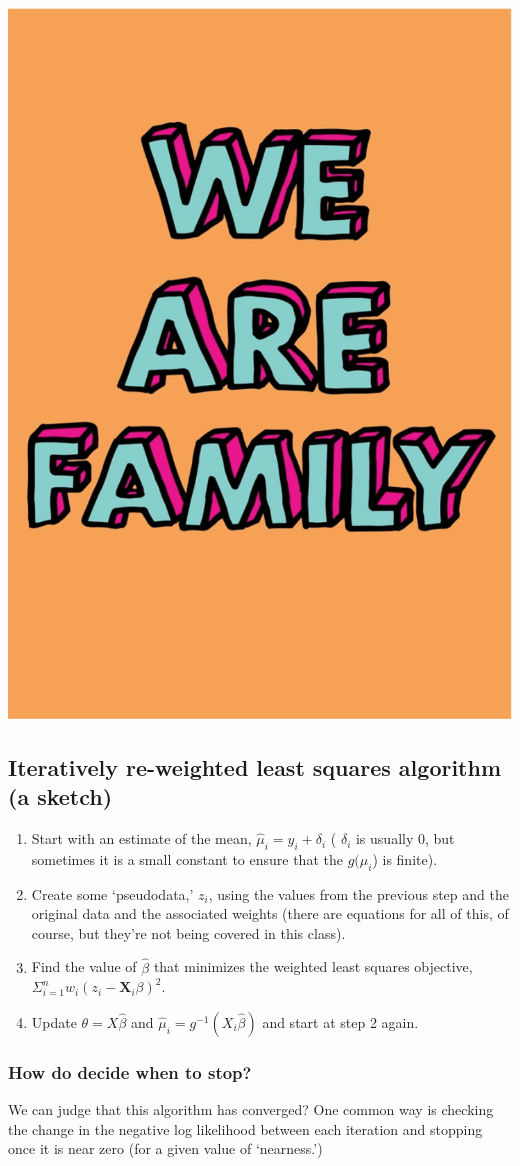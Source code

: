 \documentclass[
  openany]{book}
\providecommand{\tightlist}{%
  \setlength{\itemsep}{0pt}\setlength{\parskip}{0pt}}
\begin{document}
\begin{center}\includegraphics[width=0.3\linewidth]{images/m4/we-are-family} \end{center}

\hypertarget{iteratively-re-weighted-least-squares-algorithm-a-sketch}{%
\subsection{Iteratively re-weighted least squares algorithm (a sketch)}\label{iteratively-re-weighted-least-squares-algorithm-a-sketch}}

\begin{enumerate}
\def\labelenumi{\arabic{enumi}.}
\tightlist
\item
  Start with an estimate of the mean, \(\hat{\mu}_i = y_i + \delta_i\) (
  \(\delta_i\) is usually 0, but sometimes it is a small constant to
  ensure that the \(g(\mu_i\)) is finite).
\item
  Create some `pseudodata,' \(z_i\), using the values from the previous
  step and the original data and the associated weights (there are
  equations for all of this, of course, but they're not being covered
  in this class).
\item
  Find the value of \(\hat{\beta}\) that minimizes the weighted least
  squares objective,
  \(\Sigma^n_{i = 1}w_i(z_i - \textbf{X}_i \beta)^2\).
\item
  Update \(\theta = X\hat{\beta}\) and
  \(\hat{\mu}_i = g^{-1}(X_i\hat{\beta})\) and start at step 2 again.
\end{enumerate}

\hypertarget{how-do-decide-when-to-stop}{%
\subsubsection{How do decide when to stop?}\label{how-do-decide-when-to-stop}}

We can judge that this algorithm has converged? One common way is
checking the change in the negative log likelihood between each
iteration and stopping once it is near zero (for a given value of
`nearness.')
\end{document}
